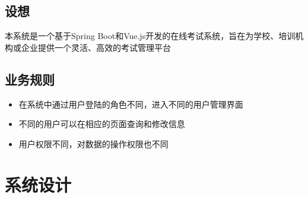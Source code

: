 \documentclass{article}
\begin{document}
\subsection{设想}
本系统是一个基于Spring Boot和Vue.js开发的在线考试系统，旨在为学校、培训机构或企业提供一个灵活、高效的考试管理平台

\subsection{业务规则}
\begin{itemize}
    \item 在系统中通过用户登陆的角色不同，进入不同的用户管理界面
    \item 不同的用户可以在相应的页面查询和修改信息
    \item 用户权限不同，对数据的操作权限也不同
\end{itemize}

\section{系统设计}
\end{document}
